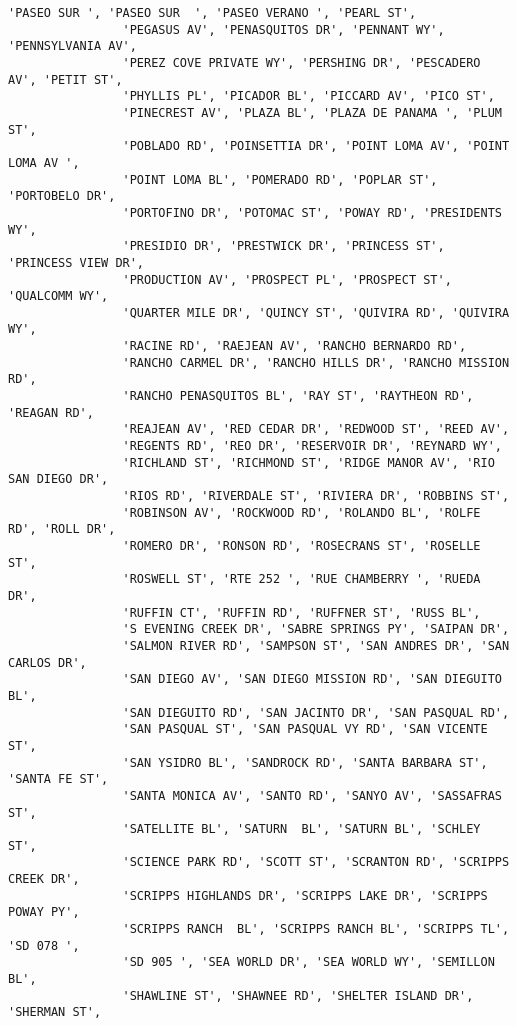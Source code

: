 \documentclass[11pt]{article}
\begin{document}
\begin{Verbatim}[commandchars=\\\{\}]
                'PASEO SUR ', 'PASEO SUR  ', 'PASEO VERANO ', 'PEARL ST',
                'PEGASUS AV', 'PENASQUITOS DR', 'PENNANT WY', 'PENNSYLVANIA AV',
                'PEREZ COVE PRIVATE WY', 'PERSHING DR', 'PESCADERO AV', 'PETIT ST',
                'PHYLLIS PL', 'PICADOR BL', 'PICCARD AV', 'PICO ST',
                'PINECREST AV', 'PLAZA BL', 'PLAZA DE PANAMA ', 'PLUM ST',
                'POBLADO RD', 'POINSETTIA DR', 'POINT LOMA AV', 'POINT LOMA AV ',
                'POINT LOMA BL', 'POMERADO RD', 'POPLAR ST', 'PORTOBELO DR',
                'PORTOFINO DR', 'POTOMAC ST', 'POWAY RD', 'PRESIDENTS WY',
                'PRESIDIO DR', 'PRESTWICK DR', 'PRINCESS ST', 'PRINCESS VIEW DR',
                'PRODUCTION AV', 'PROSPECT PL', 'PROSPECT ST', 'QUALCOMM WY',
                'QUARTER MILE DR', 'QUINCY ST', 'QUIVIRA RD', 'QUIVIRA WY',
                'RACINE RD', 'RAEJEAN AV', 'RANCHO BERNARDO RD',
                'RANCHO CARMEL DR', 'RANCHO HILLS DR', 'RANCHO MISSION RD',
                'RANCHO PENASQUITOS BL', 'RAY ST', 'RAYTHEON RD', 'REAGAN RD',
                'REAJEAN AV', 'RED CEDAR DR', 'REDWOOD ST', 'REED AV',
                'REGENTS RD', 'REO DR', 'RESERVOIR DR', 'REYNARD WY',
                'RICHLAND ST', 'RICHMOND ST', 'RIDGE MANOR AV', 'RIO SAN DIEGO DR',
                'RIOS RD', 'RIVERDALE ST', 'RIVIERA DR', 'ROBBINS ST',
                'ROBINSON AV', 'ROCKWOOD RD', 'ROLANDO BL', 'ROLFE RD', 'ROLL DR',
                'ROMERO DR', 'RONSON RD', 'ROSECRANS ST', 'ROSELLE ST',
                'ROSWELL ST', 'RTE 252 ', 'RUE CHAMBERRY ', 'RUEDA DR',
                'RUFFIN CT', 'RUFFIN RD', 'RUFFNER ST', 'RUSS BL',
                'S EVENING CREEK DR', 'SABRE SPRINGS PY', 'SAIPAN DR',
                'SALMON RIVER RD', 'SAMPSON ST', 'SAN ANDRES DR', 'SAN CARLOS DR',
                'SAN DIEGO AV', 'SAN DIEGO MISSION RD', 'SAN DIEGUITO BL',
                'SAN DIEGUITO RD', 'SAN JACINTO DR', 'SAN PASQUAL RD',
                'SAN PASQUAL ST', 'SAN PASQUAL VY RD', 'SAN VICENTE ST',
                'SAN YSIDRO BL', 'SANDROCK RD', 'SANTA BARBARA ST', 'SANTA FE ST',
                'SANTA MONICA AV', 'SANTO RD', 'SANYO AV', 'SASSAFRAS ST',
                'SATELLITE BL', 'SATURN  BL', 'SATURN BL', 'SCHLEY ST',
                'SCIENCE PARK RD', 'SCOTT ST', 'SCRANTON RD', 'SCRIPPS CREEK DR',
                'SCRIPPS HIGHLANDS DR', 'SCRIPPS LAKE DR', 'SCRIPPS POWAY PY',
                'SCRIPPS RANCH  BL', 'SCRIPPS RANCH BL', 'SCRIPPS TL', 'SD 078 ',
                'SD 905 ', 'SEA WORLD DR', 'SEA WORLD WY', 'SEMILLON BL',
                'SHAWLINE ST', 'SHAWNEE RD', 'SHELTER ISLAND DR', 'SHERMAN ST',

\end{Verbatim}
\end{document}
